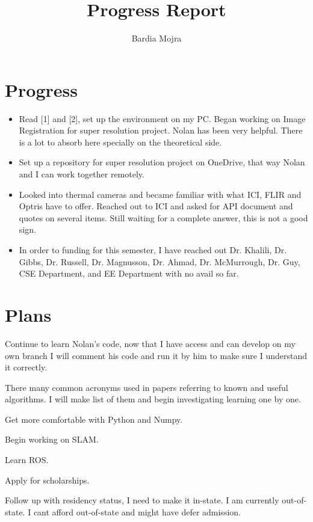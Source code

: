 \documentclass[11pt]{article}
\title{Progress Report}
\author{Bardia Mojra}
\begin{document}
	\maketitle
	\thispagestyle{empty}



\section{Progress}
\begin{itemize}
  \item Read [1] and [2], set up the environment on my PC. Began working on Image Registration for super resolution project. Nolan has been very helpful. There is a lot to absorb here specially on the theoretical side. 
  
  \item Set up a repository for super resolution project on OneDrive, that way Nolan and I can work together remotely. 
  
  \item Looked into thermal cameras and became familiar with what ICI, FLIR and Optris have to offer. Reached out to ICI and asked for API document and quotes on several items. Still waiting for a complete answer, this is not a good sign.  
  
  \item In order to funding for this semester, I have reached out Dr. Khalili, Dr. Gibbs, Dr. Russell, Dr. Magnusson, Dr. Ahmad, Dr. McMurrough, Dr. Guy, CSE Department, and EE Department with no avail so far. 
\end{itemize}

\section{Plans}

Continue to learn Nolan's code, now that I have access and can develop on my own branch I will comment his code and run it by him to make sure I understand it correctly. 

There many common acronyms used in papers referring to known and useful algorithms. I will make list of them and begin investigating learning one by one. 

Get more comfortable with Python and Numpy. 

Begin working on SLAM. 

Learn ROS. \cite{FiniteImReg}

Apply for scholarships. 

Follow up with residency status, I need to make it in-state. I am currently out-of-state. I cant afford out-of-state and might have defer admission.



%
%
\newpage 
 

\end{document}
